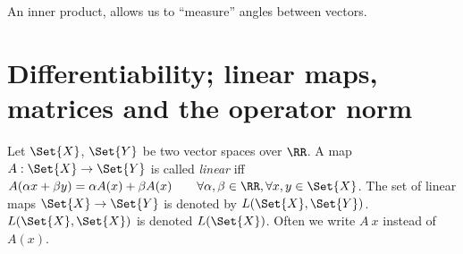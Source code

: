 \begin{rem}
 An inner product, allows us to ``measure'' angles between vectors.
\end{rem}
\section[Differentiability]{Differentiability; linear maps, matrices and the operator norm}
\begin{defn}
 Let $\Set{X}$, $\Set{Y}$ be two vector spaces over $\RR$. A map $A:\Set{X}\to\Set{Y}$ is called \emph{linear} iff $A(\alpha x+\beta y)=\alpha A(x)+\beta A(x)\qquad \forall \alpha, \beta\in\RR, \forall x,y\in\Set{X}$. The set of linear maps $\Set{X}\to\Set{Y}$ is denoted by $L(\Set{X}, \Set{Y})$. $L(\Set{X},\Set{X})$ is denoted $L(\Set{X})$. Often we write $A\ x$ instead of $A(x)$. 
\end{defn}
